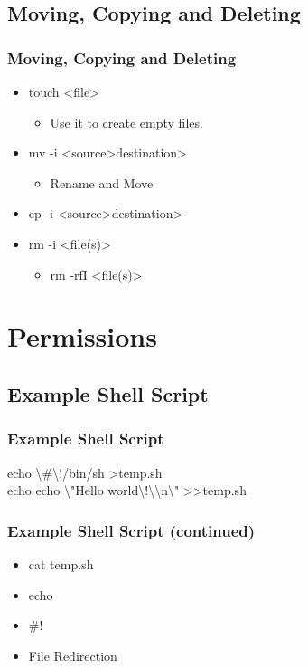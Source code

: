 \documentclass[hyperref={pdfpagelabels=false}]{beamer}
\begin{document}
\subsection{Moving, Copying and Deleting}
\frame
{
    \frametitle{Moving, Copying and Deleting}
    \begin{itemize}
    \item{touch} {\textless}file\textgreater\hspace{.5 pc}
        \begin{itemize}
        \item{Use it to create empty files.}
        \end{itemize}
    \item{mv -i {\textless}source\textgreater\hspace{.5 pc}{\textless}destination\textgreater\hspace{.5 pc}}
	\begin{itemize}
        \item{Rename and Move}
        \end{itemize}
    \item{cp -i {\textless}source\textgreater\hspace{.5 pc}{\textless}destination\textgreater\hspace{.5 pc}}
    \item{rm -i {\textless}file(s)\textgreater\hspace{.5 pc}}
	\begin{itemize}
        \item{rm -rfI {\textless}file(s)\textgreater\hspace{.5 pc}}
        \end{itemize}
    \end{itemize}
}
\section{Permissions}
\subsection{Example Shell Script}
\frame
{
    \frametitle{Example Shell Script}
    echo \textbackslash\#\textbackslash!/bin/sh \textgreater \hspace{.5 pc}temp.sh\\
    echo echo \textbackslash"Hello world\textbackslash!\textbackslash{\textbackslash}n\textbackslash" \textgreater\textgreater \hspace{.5 pc}temp.sh
}
\frame
{
    \frametitle{Example Shell Script (continued)}
    \begin{itemize}
    \item{cat temp.sh}
    \item{echo}
    \item{\#!}
    \item{File Redirection}
    \end{itemize}
}
\end{document}
